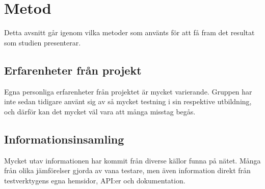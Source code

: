 \section{Metod}
\label{sec:david-method}
Detta avsnitt går igenom vilka metoder som använts för att få fram det resultat som studien presenterar.


\subsection{Erfarenheter från projekt}
Egna personliga erfarenheter från projektet är mycket varierande. Gruppen har inte sedan tidigare använt sig av så mycket testning i sin respektive utbildning, och därför kan det mycket väl vara att många misstag begås. 

\subsection{Informationsinsamling}
Mycket utav informationen har kommit från diverse källor funna på nätet. Många från olika jämförelser gjorda av vana testare, men även information direkt från testverktygens egna hemsidor, API:er och dokumentation.